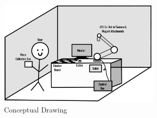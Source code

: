 \begin{figure}[h!]
	\centering
	\vspace{0.5 in}
   	\includegraphics[width=0.70\textwidth]{images/Conceptual-Drawing.jpg}
    \caption{Conceptual Drawing}
\end{figure}
